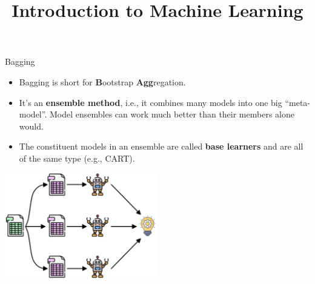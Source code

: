 \documentclass[11pt,compress,t,notes=noshow, xcolor=table]{beamer}
\title{Introduction to Machine Learning}
\begin{document}

\begin{vbframe}{Bagging}

\begin{itemize}
  \item Bagging is short for \textbf{B}ootstrap \textbf{Agg}regation.
  \item It's an \textbf{ensemble method}, i.e., it combines many models into one big \enquote{meta-model}. Model ensembles can work much better than their members alone would.
  \item The constituent models in an ensemble are called \textbf{base learners} and are all of the same type (e.g., CART).
  
\end{itemize}
\begin{center}
\includegraphics[width=0.5\textwidth]{figure_man/bagging.png}
\end{center}

\end{vbframe}
\end{document}

